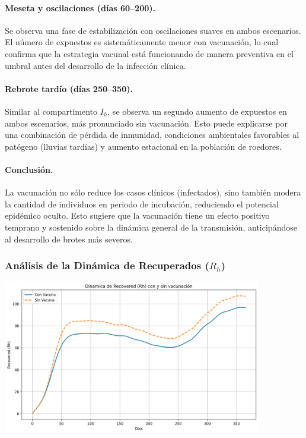 \documentclass[12pt,a4paper]{article}
\begin{document}
\paragraph{Meseta y oscilaciones (días 60–200).} Se observa una fase de estabilización con oscilaciones suaves en ambos escenarios. El número de expuestos es sistemáticamente menor con vacunación, lo cual confirma que la estrategia vacunal está funcionando de manera preventiva en el umbral antes del desarrollo de la infección clínica.

\paragraph{Rebrote tardío (días 250–350).} Similar al compartimento $I_h$, se observa un segundo aumento de expuestos en ambos escenarios, más pronunciado sin vacunación. Esto puede explicarse por una combinación de pérdida de inmunidad, condiciones ambientales favorables al patógeno (lluvias tardías) y aumento estacional en la población de roedores.

\paragraph{Conclusión.} La vacunación no sólo reduce los casos clínicos (infectados), sino también modera la cantidad de individuos en periodo de incubación, reduciendo el potencial epidémico oculto. Esto sugiere que la vacunación tiene un efecto positivo temprano y sostenido sobre la dinámica general de la transmisión, anticipándose al desarrollo de brotes más severos.



\subsubsection{Análisis de la Dinámica de Recuperados (\texorpdfstring{$R_h$}{Rh})}

\includegraphics[width=0.85\textwidth]{Images/recuperados.png}
\end{document}
